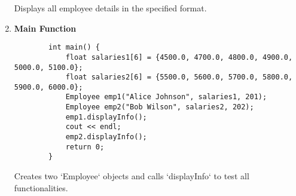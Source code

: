 \documentclass[a4paper,12pt]{article}
\begin{document}
\begin{enumerate}
    Displays all employee details in the specified format.

    \item \textbf{Main Function}

    \lstset{language=C++}
    \begin{lstlisting}
        int main() {
            float salaries1[6] = {4500.0, 4700.0, 4800.0, 4900.0, 5000.0, 5100.0};
            float salaries2[6] = {5500.0, 5600.0, 5700.0, 5800.0, 5900.0, 6000.0};
            Employee emp1("Alice Johnson", salaries1, 201);
            Employee emp2("Bob Wilson", salaries2, 202);
            emp1.displayInfo();
            cout << endl;
            emp2.displayInfo();
            return 0;
        }
    \end{lstlisting}

    Creates two `Employee` objects and calls `displayInfo` to test all functionalities.
\end{enumerate}
\end{document}
